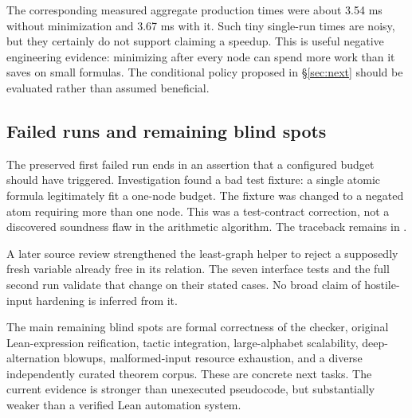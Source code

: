 The corresponding measured aggregate production times were about 3.54 ms without minimization and 3.67 ms with it. Such tiny single-run times are noisy, but they certainly do not support claiming a speedup. This is useful negative engineering evidence: minimizing after every node can spend more work than it saves on small formulas. The conditional policy proposed in \S\ref{sec:next} should be evaluated rather than assumed beneficial.

\subsection{Failed runs and remaining blind spots}
The preserved first failed run ends in an assertion that a configured budget should have triggered. Investigation found a bad test fixture: a single atomic formula legitimately fit a one-node budget. The fixture was changed to a negated atom requiring more than one node. This was a test-contract correction, not a discovered soundness flaw in the arithmetic algorithm. The traceback remains in .

A later source review strengthened the least-graph helper to reject a supposedly fresh variable already free in its relation. The seven interface tests and the full second run validate that change on their stated cases. No broad claim of hostile-input hardening is inferred from it.

The main remaining blind spots are formal correctness of the checker, original Lean-expression reification, tactic integration, large-alphabet scalability, deep-alternation blowups, malformed-input resource exhaustion, and a diverse independently curated theorem corpus. These are concrete next tasks. The current evidence is stronger than unexecuted pseudocode, but substantially weaker than a verified Lean automation system.
